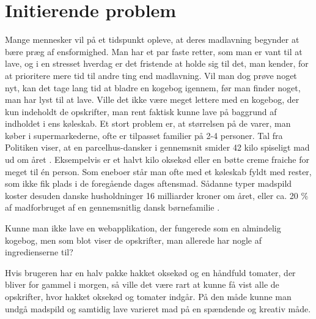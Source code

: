 \section{Initierende problem}
Mange mennesker vil på et tidspunkt opleve, at deres madlavning begynder at bære præg af ensformighed. Man har et par faste retter, som man er vant til at lave, og i en stresset hverdag er det fristende at holde sig til det, man kender, for at prioritere mere tid til andre ting end madlavning. Vil man dog prøve noget nyt, kan det tage lang tid at bladre en kogebog igennem, før man finder noget, man har lyst til at lave. Ville det ikke være meget lettere med en kogebog, der kun indeholdt de opskrifter, man rent faktisk kunne lave på baggrund af indholdet i ens køleskab. Et stort problem er, at størrelsen på de varer, man køber i supermarkederne, ofte er tilpasset familier på 2-4 personer. Tal fra Politiken viser, at en parcelhus-dansker i gennemsnit smider 42 kilo spiseligt mad ud om året \cite{madspildpol}. Eksempelvis er et halvt kilo oksekød eller en bøtte creme fraiche for meget til én person. Som eneboer står man ofte med et køleskab fyldt med rester, som ikke fik plads i de foregående dages aftensmad. Sådanne typer madspild koster desuden danske husholdninger 16 milliarder kroner om året, eller ca. 20 \% af madforbruget af en gennemsnitlig dansk børnefamilie \cite{madspild16}. 

Kunne man ikke lave en webapplikation, der fungerede som en almindelig kogebog, men som blot viser de opskrifter, man allerede har nogle af ingredienserne til? 

Hvis brugeren har en halv pakke hakket oksekød og en håndfuld tomater, der bliver for gammel i morgen, så ville det være rart at kunne få vist alle de opskrifter, hvor hakket oksekød og tomater indgår. På den måde kunne man undgå madspild og samtidig lave varieret mad på en spændende og kreativ måde.
